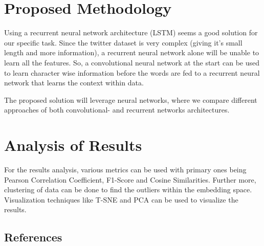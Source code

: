 \documentclass[final]{beamer}
\begin{document}
\begin{frame}[t]
\begin{multicols}{3}
\section{Proposed Methodology}

Using a recurrent neural network architecture (LSTM) seems a good solution for our specific task. Since the twitter dataset is very complex (giving it's small length and more information), a recurrent neural network alone will be unable to learn all the features. So, a convolutional neural network at the start can be used to learn character wise information before the words are fed to a recurrent neural network that learns the context within data.

The proposed solution will leverage neural networks, where we compare different approaches of both convolutional- and recurrent networks architectures.

\section{Analysis of Results}

For the results analysis, various metrics can be used with primary ones being Pearson Correlation Coefficient, F1-Score and Cosine Similarities. Further more, clustering of data can be done to find the outliers within the embedding space. Visualization techniques like T-SNE and PCA can be used to visualize the results. 



\subsection{References}




\end{multicols}

\end{frame}
\end{document}
